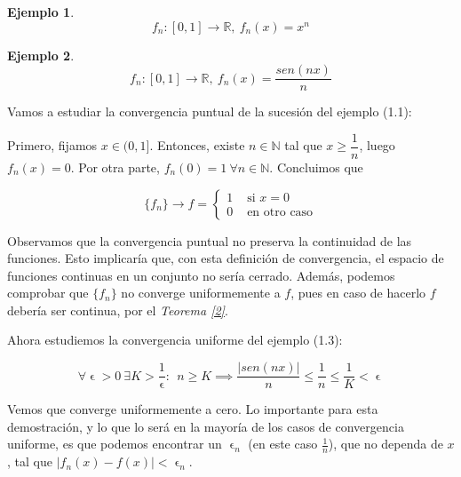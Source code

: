 \documentclass[11pt, a4paper]{article}
\let\epsilon\upvarepsilon
\providecommand{\abs}[1]{\lvert#1\rvert}
\newcommand{\R}{\mathbb{R}}
\newcommand{\N}{\mathbb{N}}
\newcommand{\fn}{\{f_n\}}
\theoremstyle{theorem-style}
\theoremstyle{definition-style}
\theoremstyle{remark-style}
\theoremstyle{example-style}
\newtheorem{ejemplo}{Ejemplo}[section]
\begin{document}
\begin{ejemplo}
	\[
	f_n : [0,1] \to \R,\ f_n(x) = x^n
	\]
\end{ejemplo}

\begin{ejemplo}
	\[
	f_n : [0,1] \to \R,\ f_n(x) = \dfrac{sen(nx)}{n}
	\]
\end{ejemplo}


Vamos a estudiar la convergencia puntual de la sucesión del ejemplo (1.1):

Primero, fijamos $x\in (0,1]$. Entonces, existe $n\in \N$ tal que $x \ge \dfrac{1}{n}$, luego $f_n(x) = 0$. Por otra parte, $f_n(0) = 1\ \forall n\in \N$. Concluimos que

\[
	\fn\to f = \begin{cases}
	1 & \text{ si } x=0\\
	0 & \text{ en otro caso}
\end{cases}
\]

Observamos que la convergencia puntual no preserva la continuidad de las funciones. Esto implicaría que, con esta definición de convergencia, el espacio de funciones continuas en un conjunto no sería cerrado. Además, podemos comprobar que $\fn$ no converge uniformemente a $f$, pues en caso de hacerlo $f$ debería ser continua, por el \textit{Teorema \ref{2}}.

Ahora estudiemos la convergencia uniforme del ejemplo (1.3):

\[
\forall\epsilon>0\ \exists K>\dfrac{1}{\epsilon}:\ \ n\ge K \implies \dfrac{\abs{sen(nx)}}{n} \le \dfrac{1}{n} \le \dfrac{1}{K} < \epsilon
\]

Vemos que converge uniformemente a cero. Lo importante para esta demostración, y lo que lo será en la mayoría de los casos de convergencia uniforme, es que podemos encontrar un $\epsilon_n$ (en este caso $\frac{1}{n}$), que no dependa de $x$, tal que $\abs{f_n(x)-f(x)} < \epsilon_n$.
\end{document}
